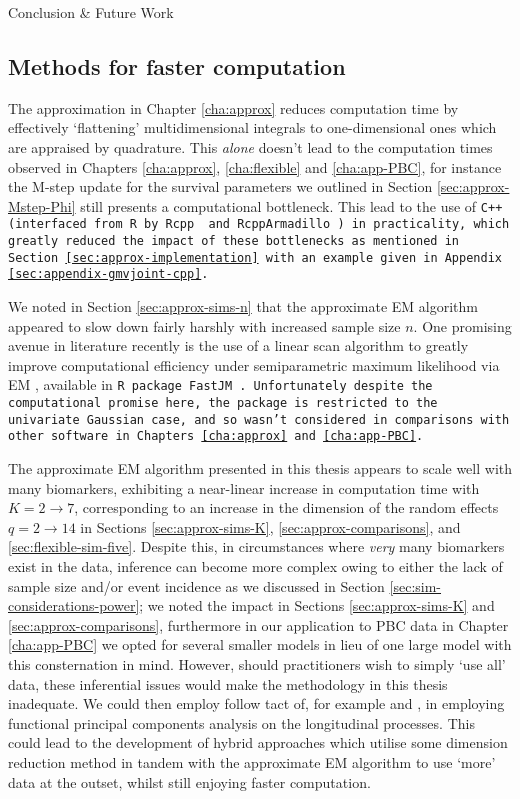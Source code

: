 \begin{chapter}{\label{cha:conclusion}Conclusion \& Future Work}
\subsection{Methods for faster computation}\label{sec:conclusion-future-faster}
The approximation in Chapter \ref{cha:approx} reduces computation time by effectively `flattening' multidimensional integrals to one-dimensional ones which are appraised by quadrature. This \textit{alone} doesn't lead to the computation times observed in Chapters \ref{cha:approx}, \ref{cha:flexible} and \ref{cha:app-PBC}, for instance the M-step update for the survival parameters we outlined in Section \ref{sec:approx-Mstep-Phi} still presents a computational bottleneck. This lead to the use of \tt{C++} (interfaced from \tt{R} by \tt{Rcpp} \citep{R-Rcpp} and \tt{RcppArmadillo} \citep{R-RcppArmadillo}) in practicality, which greatly reduced the impact of these bottlenecks as mentioned in Section \ref{sec:approx-implementation} with an example given in Appendix \ref{sec:appendix-gmvjoint-cpp}.

We noted in Section \ref{sec:approx-sims-n} that the approximate EM algorithm appeared to slow down fairly harshly with increased sample size $n$. One promising avenue in literature recently is the use of a linear scan algorithm to greatly improve computational efficiency under semiparametric maximum likelihood via EM \citep{R-FastJM-Paper}, available in \tt{R} package \tt{FastJM} \citep{R-FastJM}. Unfortunately despite the computational promise here, the package is restricted to the univariate Gaussian case, and so wasn't considered in comparisons with other software in Chapters \ref{cha:approx} and \ref{cha:app-PBC}.

The approximate EM algorithm presented in this thesis appears to scale well with many biomarkers, exhibiting a near-linear increase in computation time with $K=2\rightarrow7$, corresponding to an increase in the dimension of the random effects $q=2\rightarrow14$ in Sections \ref{sec:approx-sims-K}, \ref{sec:approx-comparisons}, and \ref{sec:flexible-sim-five}. Despite this, in circumstances where \textit{very} many biomarkers exist in the data, inference can become more complex owing to either the lack of sample size and/or event incidence as we discussed in Section \ref{sec:sim-considerations-power}; we noted the impact in Sections \ref{sec:approx-sims-K} and \ref{sec:approx-comparisons}, furthermore in our application to PBC data in Chapter \ref{cha:app-PBC} we opted for several smaller models in lieu of one large model with this consternation in mind.\newline 
However, should practitioners wish to simply `use all' data, these inferential issues would make the methodology in this thesis inadequate. We could then employ follow tact of, for example \citet{Li2017B} and \citet{Li2021}, in employing functional principal components analysis on the longitudinal processes. This could lead to the development of hybrid approaches which utilise some dimension reduction method in tandem with the approximate EM algorithm to use `more' data at the outset, whilst still enjoying faster computation.


\end{chapter}
